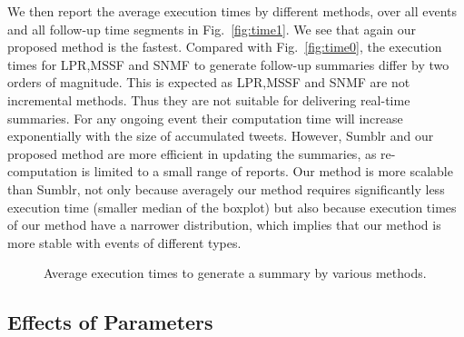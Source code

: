 \documentclass[envcountsame]{llncs}
\begin{document}
We then report the average execution times by different methods, over all events and all follow-up time segments in Fig.~\ref{fig:time1}. We see that again our proposed method is the fastest. Compared with Fig.~\ref{fig:time0}, the execution times for LPR,MSSF and SNMF to generate follow-up summaries differ by two orders of magnitude. This is expected as LPR,MSSF and SNMF are not incremental methods. Thus they are not suitable for delivering real-time summaries.  For any ongoing event their computation time will increase exponentially with the size of accumulated tweets. However, Sumblr and our proposed method are more efficient in updating the summaries, as re-computation is limited to a small range of reports. Our method is more scalable than Sumblr, not only because averagely our method requires  significantly less execution time (smaller median of the boxplot) but also  because execution times of our method have a narrower distribution, which implies that our method is more stable with events of different types.

\begin{figure}
\centering
{}
\hspace{-4ex}
\setlength{\abovecaptionskip}{-0.1cm}
\caption{Average execution times to generate a summary by various methods. }
\end{figure}

\subsection{Effects of Parameters}
\end{document}
